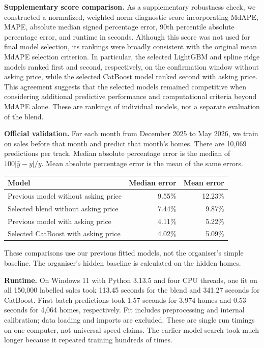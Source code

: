 \documentclass[10pt]{article}
\begin{document}
\textbf{Supplementary score comparison.} As a supplementary robustness check, we constructed a normalized, weighted norm diagnostic score incorporating MdAPE, MAPE, absolute median signed percentage error, 90th percentile absolute percentage error, and runtime in seconds. Although this score was not used for final model selection, its rankings were broadly consistent with the original mean MdAPE selection criterion. In particular, the selected LightGBM and spline ridge models ranked first and second, respectively, on the confirmation window without asking price, while the selected CatBoost model ranked second with asking price. This agreement suggests that the selected models remained competitive when considering additional predictive performance and computational criteria beyond MdAPE alone. These are rankings of individual models, not a separate evaluation of the blend.

\textbf{Official validation.} For each month from December 2025 to May 2026, we train on sales before that month and predict that month's homes. There are 10,069 predictions per track. Median absolute percentage error is the median of $100|\hat y-y|/y$. Mean absolute percentage error is the mean of the same errors.

\begin{center}
\begin{tabular}{lrr}
\toprule
Model & Median error & Mean error\\
\midrule
Previous model without asking price & 9.55\% & 12.23\%\\
Selected blend without asking price & 7.44\% & 9.87\%\\
Previous model with asking price & 4.11\% & 5.22\%\\
Selected CatBoost with asking price & 4.02\% & 5.09\%\\
\bottomrule
\end{tabular}
\end{center}
These comparisons use our previous fitted models, not the organiser's simple baseline. The organiser's hidden baseline is calculated on the hidden homes.

\textbf{Runtime.} On Windows 11 with Python 3.13.5 and four CPU threads, one fit on all 150,000 labelled sales took 113.45 seconds for the blend and 341.27 seconds for CatBoost. First batch predictions took 1.57 seconds for 3,974 homes and 0.53 seconds for 4,064 homes, respectively. Fit includes preprocessing and internal calibration; data loading and imports are excluded. These are single run timings on one computer, not universal speed claims. The earlier model search took much longer because it repeated training hundreds of times.
\end{document}
